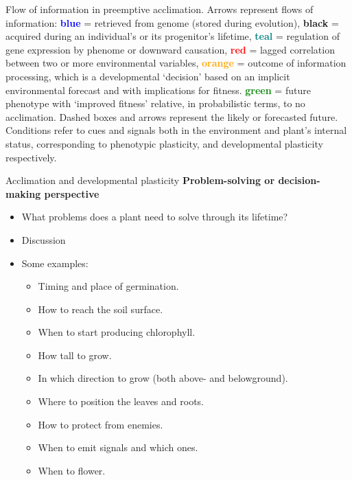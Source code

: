 \documentclass[10pt]{beamer}
\begin{document}
\begin{frame}
{\tiny Flow of information in preemptive acclimation. Arrows represent flows of information: \textcolor{blue}{\textbf{blue}} = retrieved from genome (stored during evolution), \textbf{black} = acquired during an individual's or its progenitor's lifetime, \textcolor{teal}{\textbf{teal}} = regulation of gene expression by phenome or downward causation, \textcolor{red}{\textbf{red}} = lagged correlation between two or more environmental variables, \textcolor{orange}{\textbf{orange}} = outcome of information processing, which is a developmental ‘decision’ based on an implicit environmental forecast and with implications for fitness. \textcolor{green}{\textbf{green}} = future phenotype with `improved fitness' relative, in probabilistic terms, to no acclimation. Dashed boxes and arrows represent the likely or forecasted future. Conditions refer to cues and signals both in the environment and plant's internal status, corresponding to phenotypic plasticity, and developmental plasticity respectively.}

\end{frame}

\begin{frame}{Acclimation and developmental plasticity}
\textbf{Problem-solving or decision-making perspective}
    \begin{itemize}
      \item What problems does a plant need to solve through its lifetime?
      \item Discussion
      \item Some examples:
        \begin{itemize}
          \item Timing and place of germination.
          \item How to reach the soil surface.
          \item When to start producing chlorophyll.
          \item How tall to grow.
          \item In which direction to grow (both above- and belowground).
          \item Where to position the leaves and roots.
          \item How to protect from enemies.
          \item When to emit signals and which ones.
          \item When to flower.
        \end{itemize}
    \end{itemize}
\end{frame}
\end{document}
